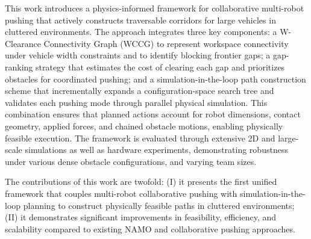 This work introduces a physics-informed framework for collaborative multi-robot
pushing that actively constructs traversable corridors for large vehicles in
cluttered environments. The approach integrates three key components: a
W-Clearance Connectivity Graph (WCCG) to represent workspace connectivity under
vehicle width constraints and to identify blocking frontier gaps; a gap-ranking
strategy that estimates the cost of clearing each gap and prioritizes obstacles
for coordinated pushing; and a simulation-in-the-loop path construction scheme
that incrementally expands a configuration-space search tree and validates each
pushing mode through parallel physical simulation. This combination ensures that
planned actions account for robot dimensions, contact geometry, applied forces,
and chained obstacle motions, enabling physically feasible execution. The
framework is evaluated through extensive 2D and large-scale simulations as well
as hardware experiments, demonstrating robustness
under various dense obstacle configurations, and varying
team sizes.

The contributions of this work are twofold: (I) it presents the first unified
framework that couples multi-robot collaborative pushing with simulation-in-the-loop
planning to construct physically feasible paths in cluttered environments; (II)
it demonstrates significant improvements in feasibility, efficiency,
and scalability compared to existing NAMO and collaborative pushing approaches.
